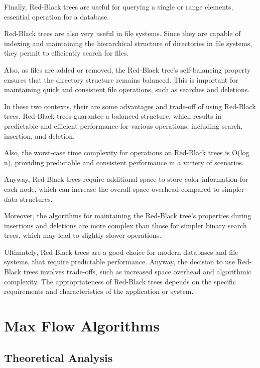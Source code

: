 \documentclass[12pt]{amsart}
\begin{document}
    Finally, Red-Black trees are useful for querying a single or range elements, essential operation for a database.
    
    
    Red-Black trees are also very useful in file systems.
    Since they are capable of indexing and maintaining the hierarchical structure of directories in file systems, they permit to efficiently search for files.
    
    Also, as files are added or removed, the Red-Black tree's self-balancing property ensures that the directory structure remains balanced. This is important for maintaining quick and consistent file operations, such as searches and deletions.
    
    
    In these two contexts, their are some advantages and trade-off of using Red-Black trees.
    Red-Black trees guarantee a balanced structure, which results in predictable and efficient performance for various operations, including search, insertion, and deletion.
    
    Also, the worst-case time complexity for operations on Red-Black trees is O(log n), providing predictable and consistent performance in a variety of scenarios.
    
    Anyway, Red-Black trees require additional space to store color information for each node, which can increase the overall space overhead compared to simpler data structures.
    
    Moreover, the algorithms for maintaining the Red-Black tree's properties during insertions and deletions are more complex than those for simpler binary search trees, which may lead to slightly slower operations.
    
    Ultimately, Red-Black trees are a good choice for modern databases and file systems, that require predictable performance. 
    Anyway, the decision to use Red-Black trees involves trade-offs, such as increased space overhead and algorithmic complexity.
    The appropriateness of Red-Black trees depends on the specific requirements and characteristics of the application or system.
    
\section{Max Flow Algorithms}

\subsection{Theoretical Analysis}
\end{document}
